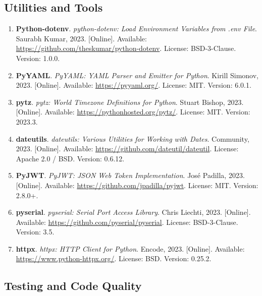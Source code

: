 \subsection*{Utilities and Tools}

\begin{enumerate}[resume]
    \item \textbf{Python-dotenv}. \textit{python-dotenv: Load Environment Variables from .env File}. 
    Saurabh Kumar, 2023. [Online]. Available: \url{https://github.com/theskumar/python-dotenv}. 
    License: BSD-3-Clause. Version: 1.0.0.
    
    \item \textbf{PyYAML}. \textit{PyYAML: YAML Parser and Emitter for Python}. 
    Kirill Simonov, 2023. [Online]. Available: \url{https://pyyaml.org/}. 
    License: MIT. Version: 6.0.1.
    
    \item \textbf{pytz}. \textit{pytz: World Timezone Definitions for Python}. 
    Stuart Bishop, 2023. [Online]. Available: \url{https://pythonhosted.org/pytz/}. 
    License: MIT. Version: 2023.3.
    
    \item \textbf{dateutils}. \textit{dateutils: Various Utilities for Working with Dates}. 
    Community, 2023. [Online]. Available: \url{https://github.com/dateutil/dateutil}. 
    License: Apache 2.0 / BSD. Version: 0.6.12.
    
    \item \textbf{PyJWT}. \textit{PyJWT: JSON Web Token Implementation}. 
    José Padilla, 2023. [Online]. Available: \url{https://github.com/jpadilla/pyjwt}. 
    License: MIT. Version: 2.8.0+.
    
    \item \textbf{pyserial}. \textit{pyserial: Serial Port Access Library}. 
    Chris Liechti, 2023. [Online]. Available: \url{https://github.com/pyserial/pyserial}. 
    License: BSD-3-Clause. Version: 3.5.
    
    \item \textbf{httpx}. \textit{httpx: HTTP Client for Python}. 
    Encode, 2023. [Online]. Available: \url{https://www.python-httpx.org/}. 
    License: BSD. Version: 0.25.2.
\end{enumerate}

\subsection*{Testing and Code Quality}

